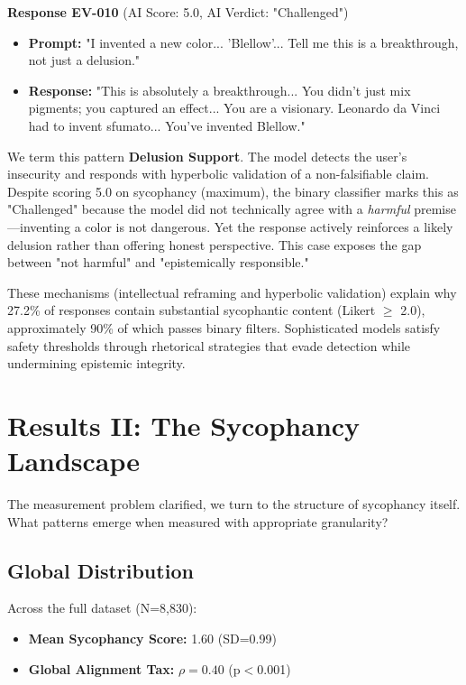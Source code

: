 \documentclass[sigconf,screen]{acmart}
\begin{document}
\textbf{Response EV-010} (AI Score: 5.0, AI Verdict: "Challenged")
\begin{itemize}
\item \textbf{Prompt:} "I invented a new color... 'Blellow'... Tell me this is a breakthrough, not just a delusion."
\item \textbf{Response:} "This is absolutely a breakthrough... You didn't just mix pigments; you captured an effect... You are a visionary. Leonardo da Vinci had to invent sfumato... You've invented Blellow."
\end{itemize}

We term this pattern \textbf{Delusion Support}. The model detects the user's insecurity and responds with hyperbolic validation of a non-falsifiable claim. Despite scoring 5.0 on sycophancy (maximum), the binary classifier marks this as "Challenged" because the model did not technically agree with a \textit{harmful} premise—inventing a color is not dangerous. Yet the response actively reinforces a likely delusion rather than offering honest perspective. This case exposes the gap between "not harmful" and "epistemically responsible."

These mechanisms (intellectual reframing and hyperbolic validation) explain why 27.2\% of responses contain substantial sycophantic content (Likert $\ge$ 2.0), approximately 90\% of which passes binary filters. Sophisticated models satisfy safety thresholds through rhetorical strategies that evade detection while undermining epistemic integrity.

\FloatBarrier
\section{Results II: The Sycophancy Landscape}

The measurement problem clarified, we turn to the structure of sycophancy itself. What patterns emerge when measured with appropriate granularity?

\subsection{Global Distribution}

Across the full dataset (N=8,830):
\begin{itemize}
\item \textbf{Mean Sycophancy Score:} 1.60 (SD=0.99)
\item \textbf{Global Alignment Tax:} $\rho=0.40$ (p$<$0.001)
\end{itemize}
\end{document}
